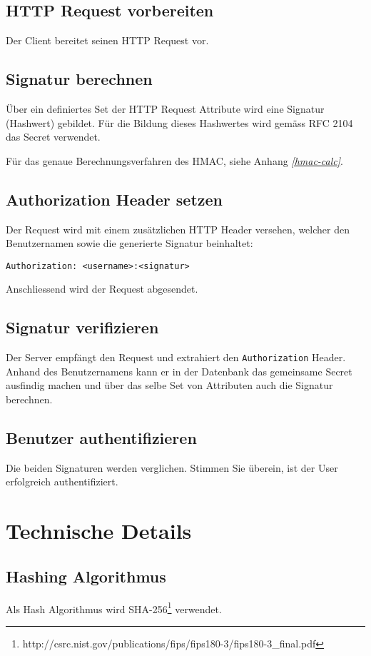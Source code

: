 \documentclass[10pt,a4paper]{scrartcl}
\begin{document}
\subsection{HTTP Request vorbereiten}
Der Client bereitet seinen HTTP Request vor. 

\subsection{Signatur berechnen}
Über ein definiertes Set der HTTP Request Attribute wird eine Signatur (Hashwert) gebildet. Für
die Bildung dieses Hashwertes wird gemäss RFC 2104 das Secret verwendet.

Für das genaue Berechnungsverfahren des HMAC, siehe Anhang \textit{\ref{hmac-calc}}.

\subsection{Authorization Header setzen}
Der Request wird mit einem zusätzlichen HTTP Header versehen, welcher den Benutzernamen sowie die
generierte Signatur beinhaltet:

\begin{verbatim}
Authorization: <username>:<signatur>
\end{verbatim}

Anschliessend wird der Request abgesendet.

\subsection{Signatur verifizieren}
Der Server empfängt den Request und extrahiert den \texttt{Authorization} Header. Anhand des
Benutzernamens kann er in der Datenbank das gemeinsame Secret ausfindig machen und über das selbe
Set von Attributen auch die Signatur berechnen.

\subsection{Benutzer authentifizieren}
Die beiden Signaturen werden verglichen. Stimmen Sie überein, ist der User erfolgreich
authentifiziert.


\section{Technische Details}

\subsection{Hashing Algorithmus}
Als Hash Algorithmus wird
SHA-256\footnote{http://csrc.nist.gov/publications/fips/fips180-3/fips180-3\_final.pdf} verwendet.
\end{document}
